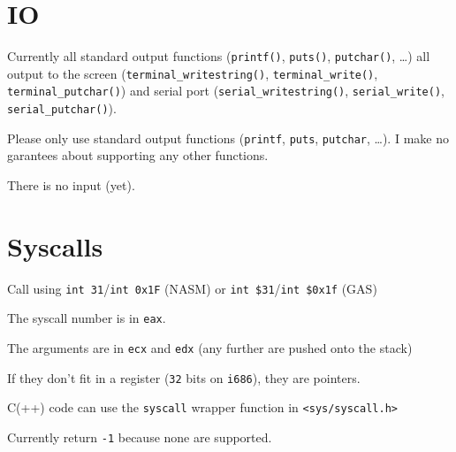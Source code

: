 \documentclass[12pt]{article}
\newcommand{\code}[1]{\colorbox{light-gray}{\texttt{#1}}}
\begin{document}
\section{IO}
\begin{list}{}{}
\item Currently all standard output functions (\code{printf()}, \code{puts()}, \code{putchar()}, \ldots) all output to the screen (\code{terminal\_writestring()}, \code{terminal\_write()}, \code{terminal\_putchar()}) and serial port (\code{serial\_writestring()}, \code{serial\_write()}, \code{serial\_putchar()}).\linebreak
\begin{list}{}{}
\item Please only use standard output functions (\code{printf}, \code{puts}, \code{putchar}, \ldots). I make no garantees about supporting any other functions.
\end{list}
\item There is no input (yet).
\end{list}

\section{Syscalls}
\begin{list}{}{}
\item Call using \code{int 31}/\code{int 0x1F} (NASM) or \code{int \$31}/\code{int \$0x1f} (GAS)
\item The syscall number is in \code{eax}.
\item The arguments are in \code{ecx} and \code{edx} (any further are pushed onto the stack)
\item If they don't fit in a register (\code{32} bits on \code{i686}), they are pointers.
\item C(++) code can use the \code{syscall} wrapper function in \code{<sys/syscall.h>}
\item Currently return \code{-1} because none are supported.
\end{list}
\end{document}
